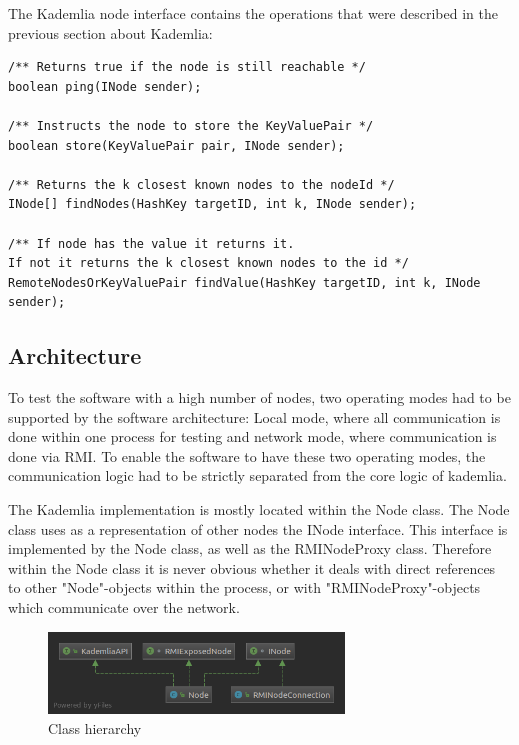 \documentclass[a4paper, 12pt]{article} %
\begin{document}
The Kademlia node interface contains the operations that were described in the previous section about Kademlia:  

\begin{verbatim}
/** Returns true if the node is still reachable */
boolean ping(INode sender);

/** Instructs the node to store the KeyValuePair */
boolean store(KeyValuePair pair, INode sender);

/** Returns the k closest known nodes to the nodeId */
INode[] findNodes(HashKey targetID, int k, INode sender);

/** If node has the value it returns it. 
If not it returns the k closest known nodes to the id */
RemoteNodesOrKeyValuePair findValue(HashKey targetID, int k, INode sender);
\end{verbatim}

\subsection{Architecture}

To test the software with a high number of nodes, two operating modes had to be supported by the software architecture: Local mode, where all communication is done within one process for testing and network mode, where communication is done via RMI. To enable the software to have these two operating modes, the communication logic had to be strictly separated from the core logic of kademlia.

The Kademlia implementation is mostly located within the Node class. The Node class uses as a representation of other nodes the INode interface. This interface is implemented by the Node class, as well as the RMINodeProxy class. Therefore within the Node class it is never obvious whether it deals with direct references to other "Node"-objects within the process, or with "RMINodeProxy"-objects which communicate over the network.

\begin{figure}
    \begin{center}
    \includegraphics[width=0.7\textwidth]{images/Node.png}
    \end{center}
    \caption{Class hierarchy}   
\end{figure}
\end{document}
